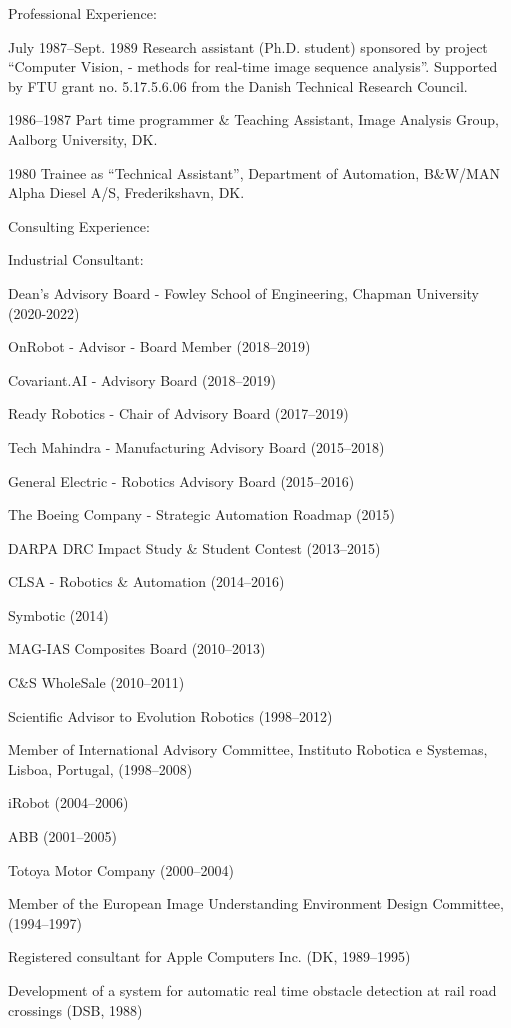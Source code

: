 \documentclass{article}
\newenvironment{sublist}{%
  \begin{list}{}{%
      \setlength{\itemsep}{0em}\setlength{\parsep}{0em}%
      \setlength{\topsep}{0em}\setlength{\parskip}{0em}%
    }%
}%
{ \end{list} }
\begin{document}
\begin{cv}
\begin{cvlist}{Professional Experience:}
\item[July 1987--Sept. 1989] Research assistant (Ph.D. student) sponsored
  by project ``Computer Vision, - methods for real-time image
  sequence analysis''. Supported by FTU grant no. 5.17.5.6.06 from the
  Danish Technical Research Council.

\item[1986--1987] Part time programmer \& Teaching Assistant,
  Image Analysis Group, Aalborg University, DK.

\item[1980] Trainee as ``Technical Assistant'', Department of
  Automation, B\&W/MAN Alpha Diesel A/S, Frederikshavn, DK.
\end{cvlist}

\begin{cvlist}{Consulting Experience:}
\item Industrial Consultant:
  \begin{sublist}
  \item Dean's Advisory Board - Fowley School of Engineering, Chapman University (2020-2022)
  \item OnRobot - Advisor - Board Member (2018--2019)
  \item Covariant.AI - Advisory Board (2018--2019)
  \item Ready Robotics - Chair of Advisory Board (2017--2019)
  \item Tech Mahindra - Manufacturing Advisory Board (2015--2018)
  \item General Electric - Robotics Advisory Board (2015--2016)
  \item The Boeing Company - Strategic Automation Roadmap (2015)
  \item DARPA DRC Impact Study \& Student Contest (2013--2015)
  \item CLSA - Robotics \& Automation (2014--2016)
  \item Symbotic (2014)
  \item MAG-IAS Composites Board (2010--2013)
  \item C\&S WholeSale (2010--2011)
  \item Scientific Advisor to Evolution Robotics (1998--2012)
  \item Member of International Advisory Committee, Instituto Robotica e
    Systemas, Lisboa, Portugal, (1998--2008)
  \item iRobot (2004--2006)
  \item ABB (2001--2005)
  \item Totoya Motor Company (2000--2004)
  \item Member of the European Image Understanding Environment Design
    Committee, (1994--1997)
  \item Registered consultant for Apple Computers Inc. (DK, 1989--1995)
  \item Development of a system for automatic real time obstacle
    detection at rail road crossings (DSB, 1988)
  \end{sublist}
\end{cvlist}


\end{cv}
\end{document}
